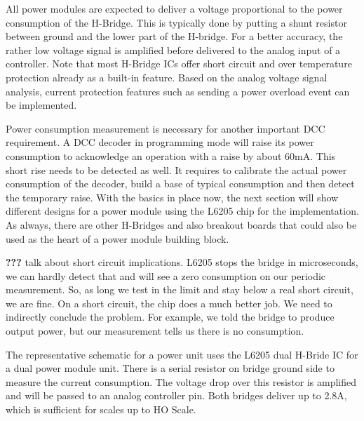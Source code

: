 All power modules are expected to deliver a voltage proportional to the power consumption of the H-Bridge. This is typically done by putting a shunt resistor between ground and the lower part of the H-bridge. For a better accuracy, the rather low voltage signal is amplified before delivered to the analog input of a controller. Note that most H-Bridge ICs offer short circuit and over temperature protection already as a built-in feature. Based on the analog voltage signal analysis, current protection features such as sending a power overload event can be implemented.

Power consumption measurement is necessary for another important DCC requirement. A DCC decoder in programming mode will raise its power consumption to acknowledge an operation with a raise by about 60mA. This short rise needs to be detected as well. It requires to calibrate the actual power consumption of the decoder, build a base of typical consumption and then detect the temporary raise. With the basics in place now, the next section will show different designs for a power module using the L6205 chip for the implementation. As always, there are other H-Bridges and also breakout boards that could also be used as the heart of a power module building block.

\textbf{???} talk about short circuit implications. L6205 stops the bridge in microseconds, we can hardly detect that and will see a zero consumption on our periodic measurement. So, as long we test in the limit and stay below a real short circuit, we are fine. On a short circuit, the chip does a much better job. We need to indirectly conclude the problem. For example, we told the bridge to produce output power, but our measurement tells us there is no consumption. 


The representative schematic for a power unit uses the L6205 dual H-Bride IC for a dual power module unit. There is a serial resistor on bridge ground side to measure the current consumption. The voltage drop over this resistor is amplified and will be passed to an analog controller pin. Both bridges deliver up to 2.8A, which is sufficient for scales up to HO Scale.

\FloatBarrier

